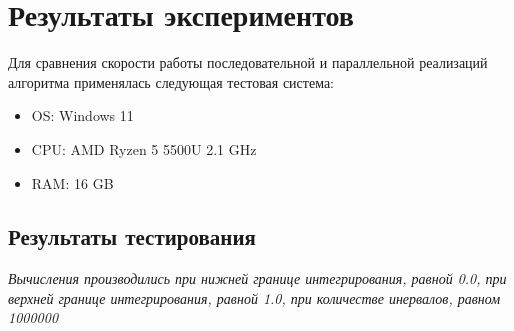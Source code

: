 \documentclass{article}
\begin{document}
\newpage 

\section{Результаты экспериментов}
\noindent Для сравнения скорости работы последовательной и параллельной реализаций алгоритма применялась следующая тестовая система:
\begin{itemize}
    \item OS: Windows 11
    \item CPU: AMD Ryzen 5 5500U 2.1 GHz
    \item RAM: 16 GB
\end{itemize}
\centering
\subsection*{Результаты тестирования}
\centering
\small\textit{Вычисления производились при нижней границе интегрирования, равной 0.0, при верхней границе интегрирования, равной 1.0, при количестве инервалов, равном 1000000} \\
    \vspace{0.5cm}


\end{document}
